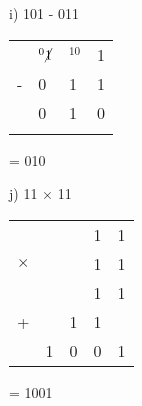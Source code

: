 \begin{figure}[H]
    \begin{minipage}[t]{0.45\textwidth}
        i) 101 - 011
        \begin{table}[H]
            \centering
            \begin{tabularx}{0.5\linewidth}{rXXX}
                & $^0\cancel{1}$ & $^10$ & 1 \\
                - & 0 & 1 & 1\\
                \cline{2-4}
                & 0 & 1 & 0\\
                \cline{2-4}
                &  & & 
            \end{tabularx}
        \end{table}
        = 010
    \end{minipage}\hfill
    \begin{minipage}[t]{0.45\textwidth}
        j) 11 $\times$ 11
        \begin{table}[H]
            \centering
            \begin{tabularx}{0.5\linewidth}{rXXXX}
                &  &  & 1 & 1 \\
                $\times$ &  &  & 1 &1 \\
                \cline{4-5}
                &  &  & 1 & 1\\
                + &  & 1 & 1 & \\
                \cline{2-5}
                & 1 & 0 & 0 & 1 \\
                \cline{2-5}
            \end{tabularx}
        \end{table}
        = 1001
    \end{minipage}\hfill
\end{figure}
